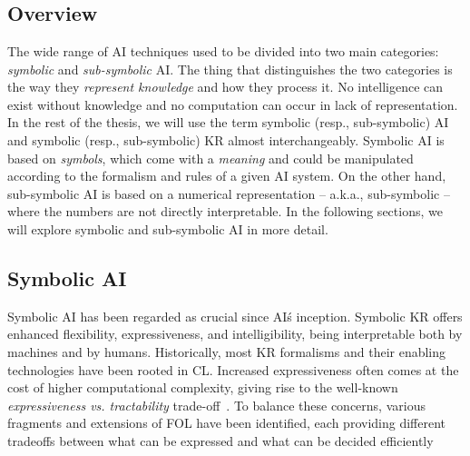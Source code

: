 
\chapter[Artificial Intelligence]{}
\label{ch:ai}
\minitoc

\section{Overview}\label{sec:ai-overview}
%
The wide range of \gls{AI} techniques used to be divided into two main categories: \emph{symbolic} and \emph{sub-symbolic} \Gls{AI}.
%
The thing that distinguishes the two categories is the way they \emph{represent knowledge} and how they process it.
%
No intelligence can exist without knowledge and no computation can occur in lack of representation.
%
In the rest of the thesis, we will use the term symbolic (resp., sub-symbolic) \Gls{AI} and symbolic (resp., sub-symbolic) \Gls{KR} almost interchangeably.
%
Symbolic \Gls{AI} is based on \emph{symbols}, which come with a \emph{meaning} and could be manipulated according to the formalism and rules of a given \Gls{AI} system.
%
On the other hand, sub-symbolic \Gls{AI} is based on a numerical representation -- a.k.a., sub-symbolic -- where the numbers are not directly interpretable.
%
%
In the following sections, we will explore symbolic and sub-symbolic \Gls{AI} in more detail.


\section{Symbolic \Gls{AI}}\label{sec:symbolic-ai}
%
Symbolic \Gls{AI} has been regarded as crucial since \Gls{AI}\'s inception.
%
Symbolic \Gls{KR} offers enhanced flexibility, expressiveness, and intelligibility, being interpretable both by machines and by humans.
%
Historically, most \Gls{KR} formalisms and their enabling technologies have been rooted in \Gls{CL}.
%
Increased expressiveness often comes at the cost of higher computational complexity, giving rise to the well-known \emph{expressiveness vs. tractability} trade-off~\cite{DBLP:conf/dlog/2003handbook}.
%
To balance these concerns, various fragments and extensions of \Gls{FOL} have been identified, each providing different tradeoffs between what can be expressed and what can be decided efficiently


